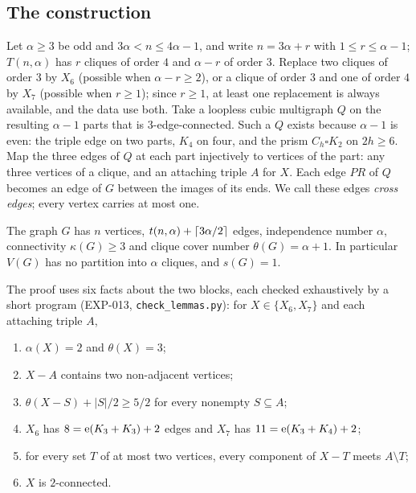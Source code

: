 \subsection{The construction}

Let $\alpha\ge3$ be odd and $3\alpha<n\le4\alpha-1$, and write $n=3\alpha+r$ with $1\le r\le\alpha-1$; $T(n,\alpha)$
has $r$ cliques of order $4$ and $\alpha-r$ of order $3$. Replace two cliques of order $3$ by $X_6$ (possible when
$\alpha-r\ge2$), or a clique of order $3$ and one of order $4$ by $X_7$ (possible when $r\ge1$); since $r\ge1$, at least
one replacement is always available, and the data use both. Take a loopless cubic multigraph $Q$ on the
resulting $\alpha-1$ parts that is $3$-edge-connected. Such a $Q$ exists because $\alpha-1$ is even: the triple edge on
two parts, $K_4$ on four, and the prism $C_h\square K_2$ on $2h\ge6$. Map the three edges of $Q$ at each part
injectively to vertices of the part: any three vertices of a clique, and an attaching triple $A$ for $X$. Each edge
$PR$ of $Q$ becomes an edge of $G$ between the images of its ends. We call these edges \emph{cross edges}; every vertex
carries at most one.

\begin{theorem}\label{thm:construction}
The graph $G$ has $n$ vertices, $t(n,\alpha)+\left\lceil 3\alpha/2\right\rceil$ edges, independence number $\alpha$, connectivity
$\kappa(G)\ge3$ and clique cover number $\theta(G)=\alpha+1$. In particular $V(G)$ has no partition into $\alpha$
cliques, and $s(G)=1$.
\end{theorem}

The proof uses six facts about the two blocks, each checked exhaustively by a short program (EXP-013,
\texttt{check\_lemmas.py}): for $X\in\{X_6,X_7\}$ and each attaching triple $A$,
\begin{enumerate}
\item[(F1)] $\alpha(X)=2$ and $\theta(X)=3$;
\item[(F2)] $X-A$ contains two non-adjacent vertices;
\item[(F3)] $\theta(X-S)+|S|/2\ge5/2$ for every nonempty $S\subseteq A$;
\item[(F4)] $X_6$ has $8=\mathrm{e}(K_3+K_3)+2$ edges and $X_7$ has $11=\mathrm{e}(K_3+K_4)+2$;
\item[(F5)] for every set $T$ of at most two vertices, every component of $X-T$ meets $A\setminus T$;
\item[(F6)] $X$ is $2$-connected.
\end{enumerate}

